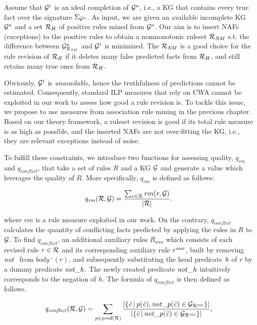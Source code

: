 Assume that $\mathcal{G}^i$ is an ideal completion of $\mathcal{G}^a$, i.e., a KG that contains every true fact over the signature $\Sigma_{\mathcal{G}^a}$. As input, we are given an available incomplete KG $\mathcal{G}^a$ and a set $\mathcal{R}_H$ of positive rules mined from $\mathcal{G}^a$. Our aim is to insert NAFs (exceptions) to the positive rules to obtain a nonmonotonic ruleset $\mathcal{R}_{\mathit{NM}}$ s.t. the difference between $\mathcal{G}^a_{\mathcal{R}_{\mathit{NM}}}$ and $\mathcal{G}^i$ is minimized. The $\mathcal{R}_{\mathit{NM}}$ is a good choice for the rule revision of $\mathcal{R}_{\mathit{H}}$ if it deletes many false predicted facts from $\mathcal{R}_H$, and still retains many true ones from $\mathcal{R}_H$.

Obviously, $\mathcal{G}^i$ is \emph{unavailable}, hence the truthfulness of predictions cannot be estimated. Consequently, standard ILP measures that rely on CWA cannot be exploited in our work to assess how good a rule revision is. To tackle this issue, we propose to use measures from association rule mining in the previous chapter. Based on our theory framework, a ruleset revision is good if its total rule measure is as high as possible, and the inserted NAFs are not over-fitting the KG, i.e., they are relevant exceptions instead of noise.

To fulfill these constraints, we introduce two functions for assessing quality, $q_{rm}$ and $q_{conflict}$, that take a set of rules $R$ and a KG $\mathcal{G}$ and generate a value which leverages the quality of $R$. More specifically, $q_{rm}$ is defined as follows:

\begin{equation}
q_{\mathit{rm}}(\mathcal{R},\mathcal{G})=\dfrac{\sum_{r\in \mathcal{R}}rm(r,\mathcal{G})}{|\mathcal{R}|}.
\end{equation}

where $rm$ is a rule measure exploited in our work. On the contrary, $q_{conflict}$ calculates the quantity of conflicting facts predicted by applying the rules in $R$ to $\mathcal{G}$. To find $q_{conflict}$, an additional auxiliary rules $R_{aux}$ which consists of each revised rule $r \in \mathcal{R}$ and its corresponding auxiliary rule $r^{\mathit{aux}}$, built by removing $\naf$ from $body^-(r)$, and subsequently substituting the head predicate $\mathit{h}$ of $r$ by a dummy predicate $\mathit{not\_h}$. The newly created predicate $\mathit{not\_h}$ intuitively corresponds to the negation of $h$. The formula of $q_{conflict}$ is then defined as follows.

\begin{equation}
\mathit{q_{conflict}(\mathcal{R},\mathcal{G})=\sum_{p\in pred(\mathcal{R})} \dfrac{|\{ \vec{c}\,|\,p(\vec{c}),not\_p(\vec{c})\in \mathcal{G}_{\mathcal{R}^{\mathit{aux}}}\} |}{|\{ \vec{c}\,|\,not\_p(\vec{c})\in \mathcal{G}_{\mathcal{R}^{\mathit{aux}}}\} |}}
\label{eq:conflict},
\end{equation}


